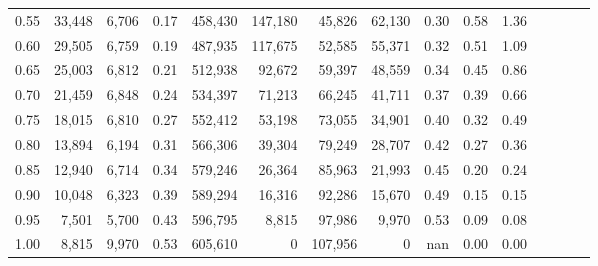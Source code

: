 \begin{tabular}{rrrcrrrrrrrrrrr}
0.55 &  33,448 &  6,706 &                                       0.17 &  458,430 &  147,180 &   45,826 &   62,130 &  0.30 &  0.58 &                         1.36 \\
0.60 &  29,505 &  6,759 &                                       0.19 &  487,935 &  117,675 &   52,585 &   55,371 &  0.32 &  0.51 &                         1.09 \\
0.65 &  25,003 &  6,812 &                                       0.21 &  512,938 &   92,672 &   59,397 &   48,559 &  0.34 &  0.45 &                         0.86 \\
0.70 &  21,459 &  6,848 &                                       0.24 &  534,397 &   71,213 &   66,245 &   41,711 &  0.37 &  0.39 &                         0.66 \\
0.75 &  18,015 &  6,810 &                                       0.27 &  552,412 &   53,198 &   73,055 &   34,901 &  0.40 &  0.32 &                         0.49 \\
0.80 &  13,894 &  6,194 &                                       0.31 &  566,306 &   39,304 &   79,249 &   28,707 &  0.42 &  0.27 &                         0.36 \\
0.85 &  12,940 &  6,714 &                                       0.34 &  579,246 &   26,364 &   85,963 &   21,993 &  0.45 &  0.20 &                         0.24 \\
0.90 &  10,048 &  6,323 &                                       0.39 &  589,294 &   16,316 &   92,286 &   15,670 &  0.49 &  0.15 &                         0.15 \\
0.95 &   7,501 &  5,700 &                                       0.43 &  596,795 &    8,815 &   97,986 &    9,970 &  0.53 &  0.09 &                         0.08 \\
1.00 &   8,815 &  9,970 &                                       0.53 &  605,610 &        0 &  107,956 &        0 &   nan &  0.00 &                         0.00 \\
\bottomrule
\end{tabular}

